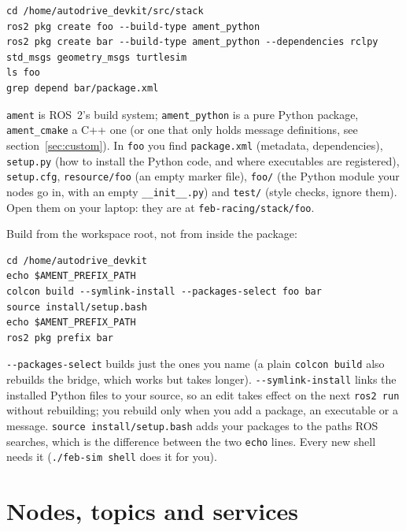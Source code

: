 \documentclass[11pt,a4paper]{article}
\begin{document}
\begin{lstlisting}
cd /home/autodrive_devkit/src/stack
ros2 pkg create foo --build-type ament_python
ros2 pkg create bar --build-type ament_python --dependencies rclpy std_msgs geometry_msgs turtlesim
ls foo
grep depend bar/package.xml
\end{lstlisting}

\texttt{ament} is ROS~2's build system; \texttt{ament\_python} is a pure Python package,
\texttt{ament\_cmake} a C++ one (or one that only holds message definitions, see
section~\ref{sec:custom}). In \texttt{foo} you find \texttt{package.xml} (metadata,
dependencies), \texttt{setup.py} (how to install the Python code, and where executables are
registered), \texttt{setup.cfg}, \texttt{resource/foo} (an empty marker file), \texttt{foo/} (the
Python module your nodes go in, with an empty \texttt{\_\_init\_\_.py}) and \texttt{test/} (style
checks, ignore them). Open them on your laptop: they are at
\texttt{feb-racing/stack/foo}.

Build from the workspace root, not from inside the package:

\begin{lstlisting}
cd /home/autodrive_devkit
echo $AMENT_PREFIX_PATH
colcon build --symlink-install --packages-select foo bar
source install/setup.bash
echo $AMENT_PREFIX_PATH
ros2 pkg prefix bar
\end{lstlisting}

\texttt{-{}-packages-select} builds just the ones you name (a plain \texttt{colcon build} also
rebuilds the bridge, which works but takes longer). \texttt{-{}-symlink-install} links the
installed Python files to your source, so an edit takes effect on the next \texttt{ros2 run}
without rebuilding; you rebuild only when you add a package, an executable or a message.
\texttt{source install/setup.bash} adds your packages to the paths ROS searches, which is the
difference between the two \texttt{echo} lines. Every new shell needs it (\texttt{./feb-sim
shell} does it for you).


\section{Nodes, topics and services}
\end{document}
